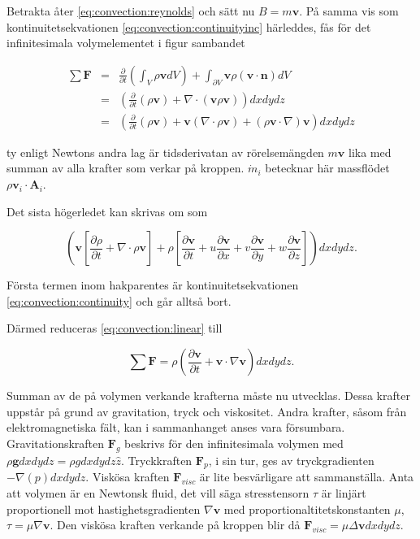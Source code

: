 Betrakta åter \eqref{eq:convection:reynolds} och sätt nu $B = m\mathbf{v}$. På samma vis som kontinuitetsekvationen \eqref{eq:convection:continuityinc} härleddes, fås för det infinitesimala volymelementet i figur sambandet

\begin{eqnarray}
\label{eq:convection:linear}
\sum \mathbf{F} & = & \frac{\partial}{\partial t} \left( \int_V \rho\mathbf{v} dV \right) + \int_{\partial V} \mathbf{v}\rho\left( \mathbf{v} \cdot \mathbf{n}\right)dV \nonumber \\
& = &\left(\frac{\partial}{\partial t} \left( \rho\mathbf{v} \right) + \nabla \cdot \left( \mathbf{v} \rho \mathbf{v}\right)\right)dxdydz \nonumber\\
& = &\left( \frac{\partial}{\partial t} \left( \rho\mathbf{v} \right) + \mathbf{v}\left(\nabla\cdot\rho\mathbf{v}\right) + \left(\rho\mathbf{v} \cdot \nabla\right) \mathbf{v}\right) dxdydz
\end{eqnarray}

ty enligt Newtons andra lag är tidsderivatan av rörelsemängden $m\mathbf{v}$ lika med summan av alla krafter som verkar på kroppen. $\dot{m}_i$ betecknar här massflödet $\rho\mathbf{v}_i\cdot\mathbf{A}_i$.

Det sista högerledet kan skrivas om som

\begin{equation}
\left( \mathbf{v}\left[ \frac{\partial \rho}{\partial t} + \nabla\cdot \rho \mathbf{v}\right] + \rho\left[ \frac{\partial \mathbf{v}}{\partial t} + u\frac{\partial\mathbf{v}}{\partial x} + v\frac{\partial\mathbf{v}}{\partial y} + w\frac{\partial\mathbf{v}}{\partial z} \right]\right)dxdydz.
\end{equation}

Första termen inom hakparentes är kontinuitetsekvationen \eqref{eq:convection:continuity} och går alltså bort.

Därmed reduceras \eqref{eq:convection:linear} till

\begin{equation}
\label{eq:convection:linearfinal}
\sum \mathbf{F} = \rho \left( \frac{\partial \mathbf{v}}{\partial t} + \mathbf{v}\cdot \nabla\mathbf{v} \right)dxdydz.
\end{equation}

Summan av de på volymen verkande krafterna måste nu utvecklas. Dessa krafter uppstår på grund av gravitation, tryck och viskositet. Andra krafter, såsom från elektromagnetiska fält, kan i sammanhanget anses vara försumbara. Gravitationskraften $\mathbf{F}_g$ beskrivs för den infinitesimala volymen med $\rho \mathbf{g} dxdydz = \rho g dxdydz \hat{z}$. Tryckkraften $\mathbf{F}_p$, i sin tur, ges av tryckgradienten $-\nabla \left( p \right) dxdydz$. Viskösa kraften $\mathbf{F}_{visc}$ är lite besvärligare att sammanställa. Anta att volymen är en Newtonsk fluid, det vill säga stresstensorn $\tau$ är linjärt proportionell mot hastighetsgradienten $\nabla\mathbf{v}$ med proportionaltitetskonstanten $\mu$, $\tau = \mu \nabla \mathbf{v}$. Den viskösa kraften verkande på kroppen blir då $\mathbf{F}_{visc} = \mu\Delta\mathbf{v}dxdydz$.

